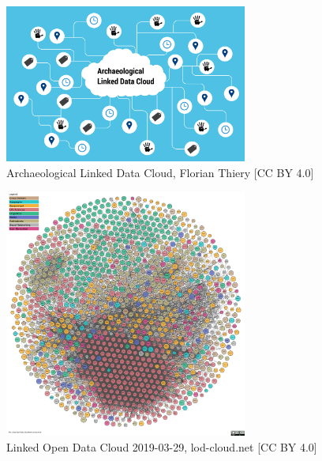 \documentclass[twocolumn]{autart}
\begin{document}
\cite{bernerslee_linkeddata}

\cite{hausenblas_5star}

\cite{isaksen_archaeology}

\cite{thiery_geinarfa}

\begin{figure}[!htb]
\begin{center}
\includegraphics[width=8cm]{Archaeological_Linked_Data_Cloud_(ALDC).png}    %
\caption{Archaeological Linked Data Cloud, Florian Thiery [CC BY 4.0]}  %
\label{figaaldc}                                 %
\end{center}                                 %
\end{figure}

\begin{figure}[!htb]
\begin{center}
\includegraphics[width=8cm]{lod-cloud.pdf}    %
\caption{Linked Open Data Cloud 2019-03-29, lod-cloud.net [CC BY 4.0]}  %
\label{figlodc}                                 %
\end{center}                                 %
\end{figure}
\end{document}
